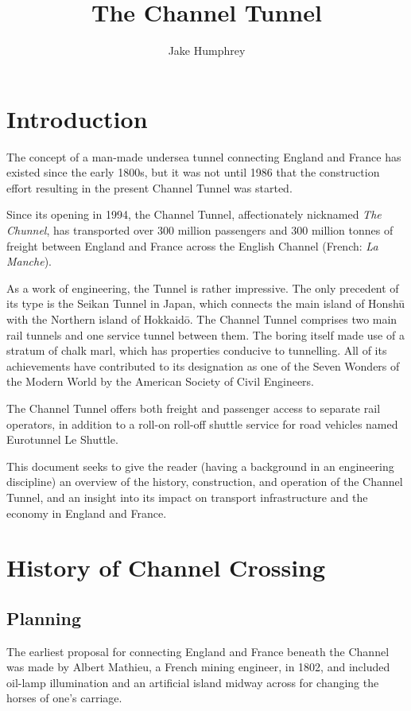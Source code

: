 \documentclass[12pt]{article} %
\title{The Channel Tunnel}
\author{Jake Humphrey}
\date{} %
\begin{document}
\maketitle

\section{Introduction}
\label{sec:intro}

The concept of a man-made undersea tunnel connecting England and France has existed since the early 1800s, but it was not until 1986 that the construction effort resulting in the present Channel Tunnel was started.

Since its opening in 1994, the Channel Tunnel, affectionately nicknamed \emph{The Chunnel}, has transported over 300 million passengers and 300 million tonnes of freight between England and France across the English Channel (French: \emph{La Manche}).

As a work of engineering, the Tunnel is rather impressive. The only precedent of its type is the Seikan Tunnel in Japan, which connects the main island of Honsh\={u} with the Northern island of Hokkaid\={o}. The Channel Tunnel comprises two main rail tunnels and one service tunnel between them. The boring itself made use of a stratum of chalk marl, which has properties conducive to tunnelling. All of its achievements have contributed to its designation as one of the Seven Wonders of the Modern World by the American Society of Civil Engineers.

The Channel Tunnel offers both freight and passenger access to separate rail operators, in addition to a roll-on roll-off shuttle service for road vehicles named Eurotunnel Le Shuttle.

This document seeks to give the reader (having a background in an engineering discipline) an overview of the history, construction, and operation of the Channel Tunnel, and an insight into its impact on transport infrastructure and the economy in England and France.

\section{History of Channel Crossing}
\subsection{Planning}

The earliest proposal for connecting England and France beneath the Channel was made by  Albert Mathieu, a French mining engineer, in 1802, and included oil-lamp illumination and an artificial island midway across for changing the horses of one's carriage.\cite{eurotunnel-build}
\end{document}
